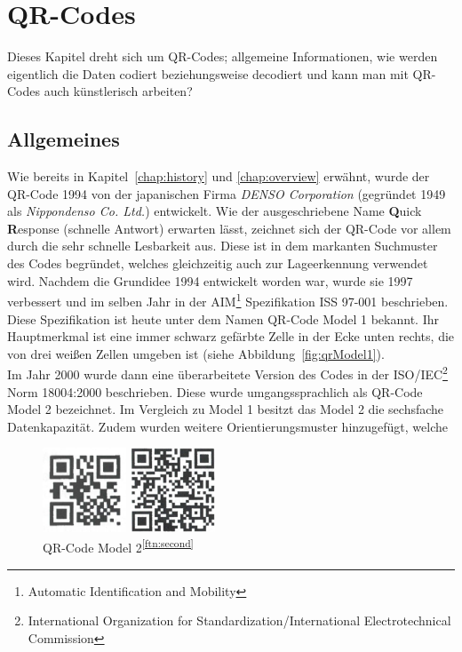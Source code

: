 \section{QR-Codes}\label{chap:qrcodes}
Dieses Kapitel dreht sich um QR-Codes; allgemeine Informationen, wie werden eigentlich die Daten codiert beziehungsweise decodiert und kann man mit QR-Codes auch künstlerisch arbeiten?

\subsection{Allgemeines}
Wie bereits in Kapitel~\ref{chap:history} und \ref{chap:overview} erwähnt, wurde der QR-Code 1994 von der japanischen Firma \textit{DENSO Corporation} (gegründet 1949 als \textit{Nippondenso Co. Ltd.}) entwickelt. Wie der ausgeschriebene Name \textbf{Q}uick \textbf{R}esponse (schnelle Antwort) erwarten lässt, zeichnet sich der QR-Code vor allem durch die sehr schnelle Lesbarkeit aus. Diese ist in dem markanten Suchmuster des Codes begründet, welches gleichzeitig auch zur Lageerkennung verwendet wird.
Nachdem die Grundidee 1994 entwickelt worden war, wurde sie 1997 verbessert und im selben Jahr in der AIM\footnote{Automatic Identification and Mobility} Spezifikation ISS 97-001 beschrieben. Diese Spezifikation ist heute unter dem Namen QR-Code Model 1 bekannt. Ihr Hauptmerkmal ist eine immer schwarz gefärbte Zelle in der Ecke unten rechts, die von drei weißen Zellen umgeben ist (siehe Abbildung~\ref{fig:qrModel1}).\\
Im Jahr 2000 wurde dann eine überarbeitete Version des Codes in der ISO/IEC\footnote{International Organization for Standardization/International Electrotechnical Commission} Norm 18004:2000 beschrieben. Diese wurde umgangssprachlich als QR-Code Model 2 bezeichnet. Im Vergleich zu Model 1 besitzt das Model 2 die sechsfache Datenkapazität. Zudem wurden weitere Orientierungsmuster hinzugefügt, welche \\
\begin{figure}[htbp]
	\parbox{.47\textwidth}
	{
		\centering
		\includegraphics[height=2.5cm]{Bilder/QR_Code_Model_1.png}
		\caption[QR-Code Model 1]{QR-Code Model 1\footnotemark}
		\label{fig:qrModel1}
	}
	\hfill
	\parbox{.47\textwidth}
	{
		\centering
		\includegraphics[height=2.5cm]{Bilder/QR_Code_Model_2.png}
		\caption[QR-Code Model 2]{QR-Code Model 2\textsuperscript{\ref{ftn:second}}}
		\label{fig:qrModel2}
	}
	\hfill
\end{figure}
